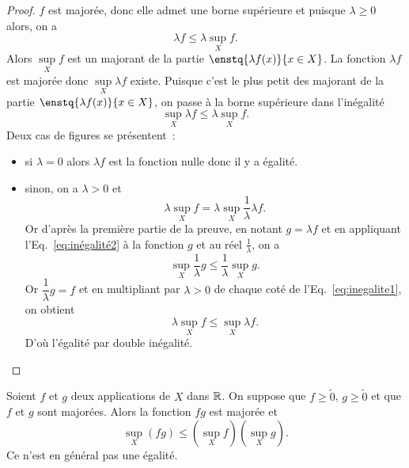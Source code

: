 \begin{proof}
  $f$ est majorée, donc elle admet une borne supérieure et puisque $\lambda \geq 0$ alors, on a
  \begin{equation}
    \lambda f \leq \lambda \sup\limits_{X}f.
  \end{equation}
  Alors $\sup\limits_{X}f$ est un majorant de la partie $\enstq{\lambda f(x)}{x \in X}$. La fonction $\lambda f$ est majorée donc $\sup\limits_{X}\lambda f$ existe. Puisque c'est le plus petit des majorant de la partie $\enstq{\lambda f(x)}{x \in X}$, on passe à la borne supérieure dans l'inégalité
  \begin{equation}
    \label{eq:inégalité2}
    \sup\limits_{X}\lambda f \leq \lambda \sup\limits_{X}f.
  \end{equation}
  Deux cas de figures se présentent~:
  \begin{itemize}
  \item si $\lambda =0$ alors $\lambda f$ est la fonction nulle donc il y a égalité.
  \item sinon, on a $\lambda > 0$ et
    \begin{equation}
      \lambda \sup\limits_{X} f= \lambda \sup\limits_{X} \frac{1}{\lambda} \lambda f.
    \end{equation}
    Or d'après la première partie de la preuve, en notant $g=\lambda f$ et en appliquant l'Eq.~\eqref{eq:inégalité2} à la fonction $g$ et au réel $\frac{1}{\lambda}$, on a
    \begin{equation}
      \label{eq:inegalite1}
      \sup\limits_{X}\frac{1}{\lambda} g \leq \frac{1}{\lambda} \sup\limits_{X}g.
    \end{equation}
Or $\dfrac{1}{\lambda}g=f$ et en multipliant par $\lambda > 0$ de chaque coté de l'Eq.~\eqref{eq:inegalite1}, on obtient
    \begin{equation}
      \lambda \sup\limits_{X} f \leq \sup\limits_{X}\lambda f.
    \end{equation}
    D'où l'égalité par double inégalité.
  \end{itemize}
\end{proof}
\begin{prop}
  Soient $f$ et $g$ deux applications de $X$ dans $\mathbb{R}$. On suppose que $f \geq \tilde{0}$, $g \geq \tilde{0}$ et que $f$ et $g$ sont majorées. Alors la fonction $fg$ est majorée et
  \begin{equation}
    \sup\limits_{X}(fg) \leq (\sup\limits_{X}f)(\sup\limits_{X}g).
  \end{equation}
Ce n'est en général pas une égalité.
\end{prop}
